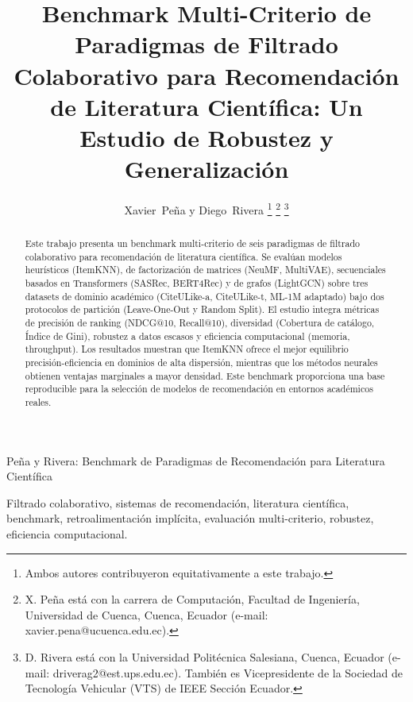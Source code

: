 \documentclass[journal]{IEEEtran}
\begin{document}
\title{Benchmark Multi-Criterio de Paradigmas de Filtrado Colaborativo para Recomendación de Literatura Científica: Un Estudio de Robustez y Generalización}

\author{Xavier~Peña y Diego~Rivera%
\thanks{Ambos autores contribuyeron equitativamente a este trabajo.}%
\thanks{X. Peña está con la carrera de Computación, Facultad de Ingeniería, Universidad de Cuenca, Cuenca, Ecuador (e-mail: xavier.pena@ucuenca.edu.ec).}%
\thanks{D. Rivera está con la Universidad Politécnica Salesiana, Cuenca, Ecuador (e-mail: driverag2@est.ups.edu.ec). También es Vicepresidente de la Sociedad de Tecnología Vehicular (VTS) de IEEE Sección Ecuador.}}

%
{Peña y Rivera: Benchmark de Paradigmas de Recomendación para Literatura Científica}

\maketitle

\begin{abstract}
Este trabajo presenta un benchmark multi-criterio de seis paradigmas de filtrado colaborativo para recomendación de literatura científica. Se evalúan modelos heurísticos (ItemKNN), de factorización de matrices (NeuMF, MultiVAE), secuenciales basados en Transformers (SASRec, BERT4Rec) y de grafos (LightGCN) sobre tres datasets de dominio académico (CiteULike-a, CiteULike-t, ML-1M adaptado) bajo dos protocolos de partición (Leave-One-Out y Random Split). El estudio integra métricas de precisión de ranking (NDCG@10, Recall@10), diversidad (Cobertura de catálogo, Índice de Gini), robustez a datos escasos y eficiencia computacional (memoria, throughput). Los resultados muestran que ItemKNN ofrece el mejor equilibrio precisión-eficiencia en dominios de alta dispersión, mientras que los métodos neurales obtienen ventajas marginales a mayor densidad. Este benchmark proporciona una base reproducible para la selección de modelos de recomendación en entornos académicos reales.
\end{abstract}

\begin{IEEEkeywords}
Filtrado colaborativo, sistemas de recomendación, literatura científica, benchmark, retroalimentación implícita, evaluación multi-criterio, robustez, eficiencia computacional.
\end{IEEEkeywords}
\end{document}
